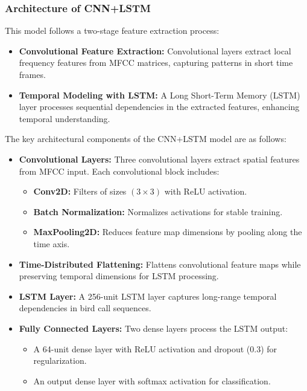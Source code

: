       \subsubsection{Architecture of CNN+LSTM}
      This model follows a two-stage feature extraction process:

      \begin{itemize}
      \item \textbf{Convolutional Feature Extraction:} Convolutional layers extract local frequency features from MFCC matrices, capturing patterns in short time frames.
      \item \textbf{Temporal Modeling with LSTM:} A Long Short-Term Memory (LSTM) layer processes sequential dependencies in the extracted features, enhancing temporal understanding.
      \end{itemize}

      The key architectural components of the CNN+LSTM model are as follows:

      \begin{itemize}
      \item \textbf{Convolutional Layers:} Three convolutional layers extract spatial features from MFCC input. Each convolutional block includes:
      \begin{itemize}
            \item \textbf{Conv2D:} Filters of sizes $(3 \times 3)$ with ReLU activation.
            \item \textbf{Batch Normalization:} Normalizes activations for stable training.
            \item \textbf{MaxPooling2D:} Reduces feature map dimensions by pooling along the time axis.
      \end{itemize}
      
      \item \textbf{Time-Distributed Flattening:} Flattens convolutional feature maps while preserving temporal dimensions for LSTM processing.
      
      \item \textbf{LSTM Layer:} A 256-unit LSTM layer captures long-range temporal dependencies in bird call sequences.
      
      \item \textbf{Fully Connected Layers:} Two dense layers process the LSTM output:
      \begin{itemize}
            \item A 64-unit dense layer with ReLU activation and dropout (0.3) for regularization.
            \item An output dense layer with softmax activation for classification.
      \end{itemize}
      \end{itemize}

